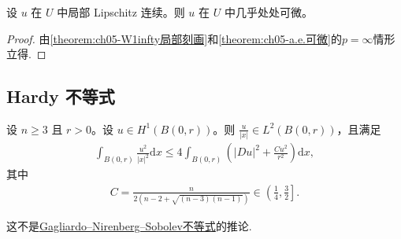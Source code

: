\documentclass[../../main.tex]{subfiles}
\begin{document}
\begin{theorem}[Rademacher 定理]\label{theorem:ch05-Rademacher}设 $u$ 在 $U$ 中局部 Lipschitz 连续。则 $u$ 在 $U$ 中几乎处处可微。
\end{theorem}
\begin{proof}
由\cref{theorem:ch05-W1infty局部刻画}和\cref{theorem:ch05-a.e.可微}的$p=\infty$情形立得.
\end{proof}

\subsection{Hardy 不等式}\label{subsection:ch05-Hardy}

\begin{theorem}[Hardy不等式]\label{theorem:ch05-Hardy}
设 $n\geqslant 3$ 且 $r>0$。设 $u\in H^1(B(0,r))$。则 $\frac{u}{|x|}\in L^2(B(0,r))$，且满足
\begin{align}\label{eq:Hardy-ineq-17}
\int_{B(0,r)} \frac{u^2}{|x|^2} \mathrm{d}x \leqslant 4 \int_{B(0,r)} \left( |Du|^2 + \frac{C u^2}{r^2} \right) \mathrm{d}x,
\end{align}
其中
\begin{align*}
C = \frac{n}{2(n-2 + \sqrt{(n-3)(n-1)})} \in \left(\frac{1}{4}, \frac{3}{2}\right].
\end{align*}
\end{theorem}
\begin{remark}
这不是\hyperref[theorem:Gagliardo--Nirenberg--Sobolev不等式]{Gagliardo--Nirenberg--Sobolev不等式}的推论.
\end{remark}
\end{document}
